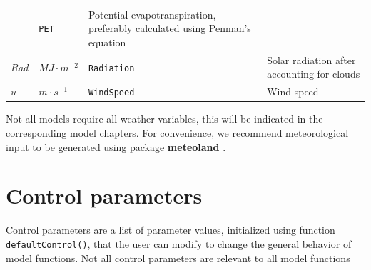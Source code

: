 \documentclass[]{book}
\begin{document}
\begin{longtable}[]{@{}llll@{}}
\begin{minipage}[t]{0.10\columnwidth}
\end{minipage} & \begin{minipage}[t]{0.12\columnwidth}\raggedright
\texttt{PET}\strut
\end{minipage} & \begin{minipage}[t]{0.45\columnwidth}\raggedright
Potential evapotranspiration, preferably calculated using Penman's equation\strut
\end{minipage}\tabularnewline
\begin{minipage}[t]{0.11\columnwidth}\raggedright
\(Rad\)\strut
\end{minipage} & \begin{minipage}[t]{0.10\columnwidth}\raggedright
\(MJ \cdot m^{-2}\)\strut
\end{minipage} & \begin{minipage}[t]{0.12\columnwidth}\raggedright
\texttt{Radiation}\strut
\end{minipage} & \begin{minipage}[t]{0.45\columnwidth}\raggedright
Solar radiation after accounting for clouds\strut
\end{minipage}\tabularnewline
\begin{minipage}[t]{0.11\columnwidth}\raggedright
\(u\)\strut
\end{minipage} & \begin{minipage}[t]{0.10\columnwidth}\raggedright
\(m \cdot s^{-1}\)\strut
\end{minipage} & \begin{minipage}[t]{0.12\columnwidth}\raggedright
\texttt{WindSpeed}\strut
\end{minipage} & \begin{minipage}[t]{0.45\columnwidth}\raggedright
Wind speed\strut
\end{minipage}\tabularnewline
\bottomrule
\end{longtable}

Not all models require all weather variables, this will be indicated in the corresponding model chapters. For convenience, we recommend meteorological input to be generated using package \textbf{meteoland} \citep{DeCaceres2018}.

\hypertarget{control-parameters}{%
\section{Control parameters}\label{control-parameters}}

Control parameters are a list of parameter values, initialized using function \texttt{defaultControl()}, that the user can modify to change the general behavior of model functions. Not all control parameters are relevant to all model functions
\end{document}
